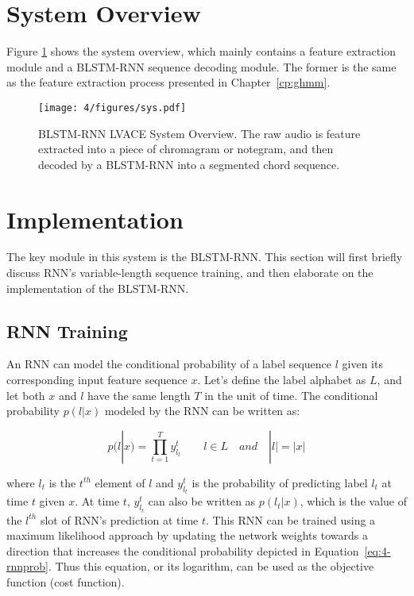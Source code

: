 \section{System Overview}\label{sec:4-sysover}
Figure \ref{fig:4-sysover} shows the system overview, which mainly contains a feature extraction module and a BLSTM-RNN sequence decoding module. The former is the same as the feature extraction process presented in Chapter~\ref{cp:ghmm}.

\begin{figure}[htb]
\centering
\texttt{[image: 4/figures/sys.pdf]}
\caption{BLSTM-RNN LVACE System Overview. The raw audio is feature extracted into a piece of chromagram or notegram, and then decoded by a BLSTM-RNN into a segmented chord sequence.}
\label{fig:4-sysover}
\end{figure}

\section{Implementation}\label{sec:4-blstm}
The key module in this system is the BLSTM-RNN. This section will first briefly discuss RNN's variable-length sequence training, and then elaborate on the implementation of the BLSTM-RNN.

\subsection{RNN Training}\label{sec:4-rnntrain}
An RNN can model the conditional probability of a label sequence $l$ given its corresponding input feature sequence $x$. Let's define the label alphabet as $L$, and let both $x$ and $l$ have the same length $T$ in the unit of time. The conditional probability $p(l|x)$ modeled by the RNN can be written as:

\begin{equation}\label{eq:4-rnnprob}
p(l|x) = \prod_{t=1}^T y_{l_t}^t  \quad\quad l\in L \quad and \quad |l| = |x|
\end{equation}

where $l_t$ is the $t^{th}$ element of $l$ and $y_{l_t}^t$ is the probability of predicting label $l_t$ at time $t$ given $x$. At time $t$, $y_{l_t}^t$ can also be written as $p(l_t|x)$, which is the value of the $l^{th}$ slot of RNN's prediction at time $t$. This RNN can be trained using a maximum likelihood approach by updating the network weights towards a direction that increases the conditional probability depicted in Equation~\ref{eq:4-rnnprob}. Thus this equation, or its logarithm, can be used as the objective function (cost function).

